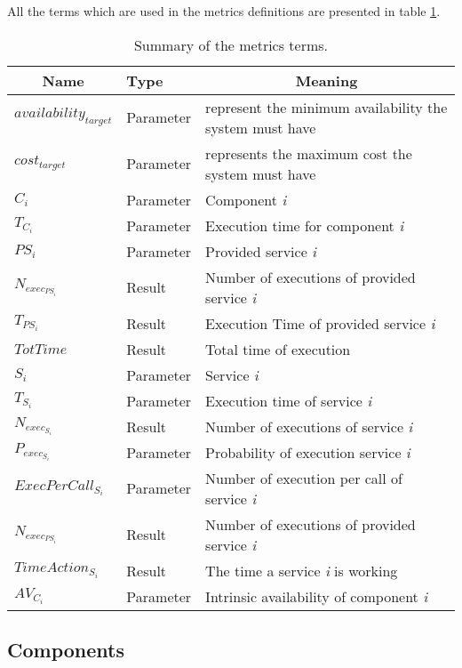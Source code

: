 \noindent All the terms which are used in the metrics definitions are presented in table \ref{tab:new-metrics-summary}.

\begin{table}[ht!b]
	\centering
	\begin{tabular}{|l|l|l|}
		\hline
		\multicolumn{1}{|c|}{Name} & Type & \multicolumn{1}{c|}{Meaning} \\
		\hline 
		$availability_{target}$ & Parameter & represent the minimum availability the system must have \\
		\hline
		$cost_{target}$ & Parameter & represents the maximum cost the system must have \\ 
		\hline
		$C_i$ & Parameter & Component \emph{i} \\ 
		\hline
		$T_{C_i}$ & Parameter & Execution time for component \emph{i} \\
		\hline
		$PS_i$ & Parameter & Provided service \emph{i} \\
		\hline
		$N_{exec_{PS_i}}$ & Result & Number of executions of provided service \emph{i} \\
		\hline
		$T_{PS_i}$ & Result & Execution Time of provided service \emph{i} \\
		\hline
		$TotTime$ & Result & Total time of execution \\
		\hline
		$S_i$ & Parameter & Service \emph{i} \\
		\hline
		$T_{S_i}$ & Parameter & Execution time of service \emph{i} \\
		\hline
		$N_{exec_{S_i}}$ & Result & Number of executions of service \emph{i} \\
		\hline
		$P_{exec_{S_i}}$ & Parameter & Probability of execution service \emph{i} \\
		\hline
		$ExecPerCall_{S_i}$ & Parameter & Number of execution per call of service \emph{i} \\
		\hline
		$N_{exec_{PS_i}}$ & Result &  Number of executions of provided service \emph{i} \\
		\hline
		$TimeAction_{S_i}$ & Result & The time a service \emph{i} is working \\
		\hline
		$AV_{C_i}$ & Parameter & Intrinsic availability of component \emph{i} \\
		\hline
	\end{tabular} 
	\caption[New Metrics]{Summary of the metrics terms.}
	\label{tab:new-metrics-summary}
\end{table}

\subsection{Components}
